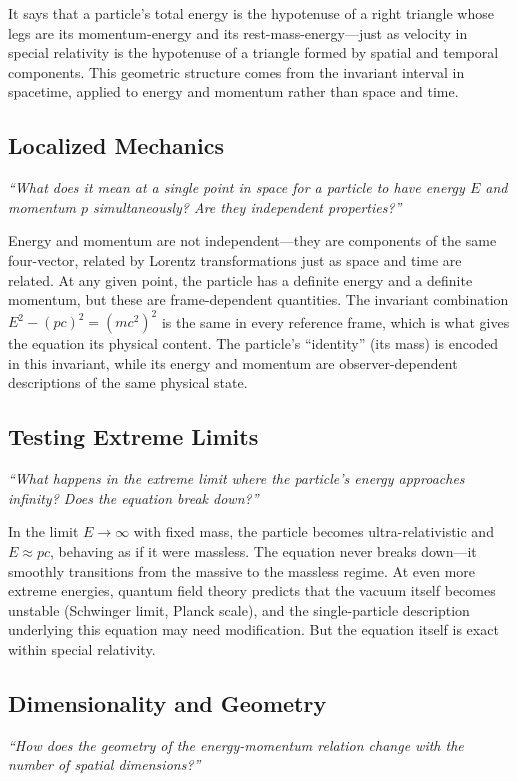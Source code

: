It says that a particle's total energy is the hypotenuse of a right triangle whose legs are its momentum-energy and its rest-mass-energy---just as velocity in special relativity is the hypotenuse of a triangle formed by spatial and temporal components. This geometric structure comes from the invariant interval in spacetime, applied to energy and momentum rather than space and time.

\subsection*{Localized Mechanics}
\textit{``What does it mean at a single point in space for a particle to have energy $E$ and momentum $p$ simultaneously? Are they independent properties?''}

Energy and momentum are not independent---they are components of the same four-vector, related by Lorentz transformations just as space and time are related. At any given point, the particle has a definite energy and a definite momentum, but these are frame-dependent quantities. The invariant combination $E^2 - (pc)^2 = (mc^2)^2$ is the same in every reference frame, which is what gives the equation its physical content. The particle's ``identity'' (its mass) is encoded in this invariant, while its energy and momentum are observer-dependent descriptions of the same physical state.

\subsection*{Testing Extreme Limits}
\textit{``What happens in the extreme limit where the particle's energy approaches infinity? Does the equation break down?''}

In the limit $E \to \infty$ with fixed mass, the particle becomes ultra-relativistic and $E \approx pc$, behaving as if it were massless. The equation never breaks down---it smoothly transitions from the massive to the massless regime. At even more extreme energies, quantum field theory predicts that the vacuum itself becomes unstable (Schwinger limit, Planck scale), and the single-particle description underlying this equation may need modification. But the equation itself is exact within special relativity.

\subsection*{Dimensionality and Geometry}
\textit{``How does the geometry of the energy-momentum relation change with the number of spatial dimensions?''}

